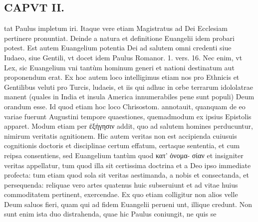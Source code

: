 \documentclass{article}
\begin{document}
\begin{pages}
\section*{CAPVT II. }
\marginpar{[ p.53 ]}\pstart tat Paulus impletum iri. Itaque vere etiam Magistratus ad Dei Ecclesiam pertinere pronuntiat.  \pend\pstart Deinde a natura et definitione Euangelii idem probari potest. Est autem Euangelium potentia Dei ad salutem omni credenti siue Iudaeo, siue Gentili, vt docet idem Paulus Romanor. 1. vers. 16. Nec enim, vt Lex, sic Euangelium vni tantùm hominum generi et nationi destinatum aut proponendum erat. Ex hoc autem loco intelligimus etiam nos pro Ethnicis et Gentilibus veluti pro Turcis, ludaeis, et iis qui adhuc in orbe terrarum idololatrae manent (quales in India et insula America innumerabiles pene sunt populi) Deum orandum esse. Id quod etiam hoc loco Chrisostom. annotauit, quanquam de eo variae fuerunt Augustini tempore quaestiones, quemadmodum ex ipsius Epistolis apparet.  \pend\pstart Modum etiam per ἐξήγησιν addit, quo ad salutem homines perducuntur, nimirum veritatis agnitionem. Hic autem veritas non est accipienda cuiusuis cognitionis doctoris et disciplinae certum effatum, certaque sententia, et cum reipsa consentiens, sed Euangelium tantùm quod κατ' ὀνομα- σίαν et insigniter veritas appellatur, tum quod illa sit certissima doctrina et a Deo ipso immediate profecta: tum etiam quod sola sit veritas aestimanda, a nobis et consectanda, et persequenda: reliquae vero artes quatenus huic subseruiunt et ad vitae huius commoditatem pertinent, exercendae. Ex quo etiam colligitur non alios velle Deum saluos fieri, quam qui ad fidem Euangelii perueni unt, illique credunt. Non sunt enim ista duo distrahenda, quae hic Paulus coniungit, ne quis se  \pend

\end{pages}
\end{document}
